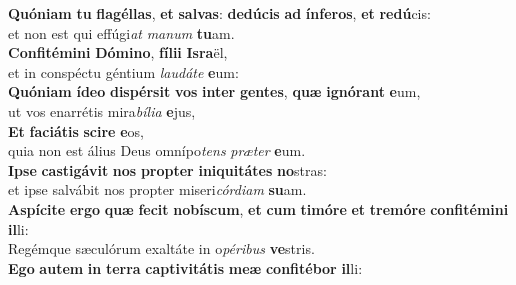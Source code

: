 \evenverse \textbf{Quó}\textbf{ni}\textbf{am} \textbf{tu} \textbf{fla}\textbf{gél}\textbf{las}, \textbf{et} \textbf{sal}\textbf{vas}: \textbf{de}\textbf{dú}\textbf{cis} \textbf{ad} \textbf{ín}\textbf{fe}\textbf{ros}, \textbf{et} \textbf{re}\textbf{dú}cis:~\*\\
\evenverse et non est qui effúgi\textit{at} \textit{ma}\textit{num} \textbf{tu}am.\\
\oddverse \textbf{Con}\textbf{fi}\textbf{té}\textbf{mi}\textbf{ni} \textbf{Dó}\textbf{mi}\textbf{no}, \textbf{fí}\textbf{li}\textbf{i} \textbf{Is}\textbf{ra}ël,~\*\\
\oddverse et in conspéctu géntium \textit{lau}\textit{dá}\textit{te} \textbf{e}um:\\
\evenverse \textbf{Quó}\textbf{ni}\textbf{am} \textbf{í}\textbf{de}\textbf{o} \textbf{di}\textbf{spér}\textbf{sit} \textbf{vos} \textbf{in}\textbf{ter} \textbf{gen}\textbf{tes}, \textbf{quæ} \textbf{i}\textbf{gnó}\textbf{rant} \textbf{e}um,~\*\\
\evenverse ut vos enarrétis mira\textit{bí}\textit{li}\textit{a} \textbf{e}jus,\\
\oddverse \textbf{Et} \textbf{fa}\textbf{ci}\textbf{á}\textbf{tis} \textbf{sci}\textbf{re} \textbf{e}os,~\*\\
\oddverse quia non est álius Deus omnípo\textit{tens} \textit{præ}\textit{ter} \textbf{e}um.\\
\evenverse \textbf{I}\textbf{pse} \textbf{ca}\textbf{sti}\textbf{gá}\textbf{vit} \textbf{nos} \textbf{prop}\textbf{ter} \textbf{i}\textbf{ni}\textbf{qui}\textbf{tá}\textbf{tes} \textbf{no}stras:~\*\\
\evenverse et ipse salvábit nos propter miseri\textit{cór}\textit{di}\textit{am} \textbf{su}am.\\
\oddverse \textbf{A}\textbf{spí}\textbf{ci}\textbf{te} \textbf{er}\textbf{go} \textbf{quæ} \textbf{fe}\textbf{cit} \textbf{no}\textbf{bí}\textbf{scum}, \textbf{et} \textbf{cum} \textbf{ti}\textbf{mó}\textbf{re} \textbf{et} \textbf{tre}\textbf{mó}\textbf{re} \textbf{con}\textbf{fi}\textbf{té}\textbf{mi}\textbf{ni} \textbf{il}li:~\*\\
\oddverse Regémque sæculórum exaltáte in o\textit{pé}\textit{ri}\textit{bus} \textbf{ve}stris.\\
\evenverse \textbf{E}\textbf{go} \textbf{au}\textbf{tem} \textbf{in} \textbf{ter}\textbf{ra} \textbf{cap}\textbf{ti}\textbf{vi}\textbf{tá}\textbf{tis} \textbf{me}\textbf{æ} \textbf{con}\textbf{fi}\textbf{té}\textbf{bor} \textbf{il}li:~\*\\
